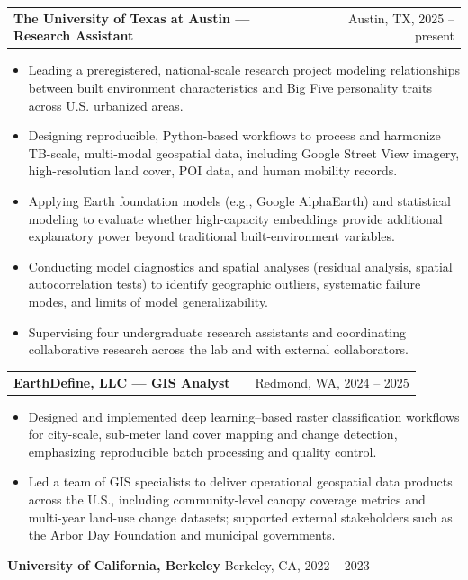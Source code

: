 \documentclass[a4paper,12pt]{article}
\makeatletter
\newenvironment{joblong}[2]
{
\begin{tabularx}{\linewidth}{@{}l X r@{}}
\textbf{#1} & \hfill &  #2 \\[3.75pt]
\end{tabularx}
\begin{minipage}[t]{\linewidth}
\begin{itemize}[nosep,after=\strut,leftmargin=1.2em,itemsep=3pt,label=--]
}
{
\end{itemize}
\end{minipage}
}
\makeatother
\begin{document}
\begin{joblong}{The University of Texas at Austin --- Research Assistant}{Austin, TX, 2025 -- present}
\item Leading a preregistered, national-scale research project modeling relationships between built environment characteristics and Big Five personality traits across U.S. urbanized areas.
\item Designing reproducible, Python-based workflows to process and harmonize TB-scale, multi-modal geospatial data, including Google Street View imagery, high-resolution land cover, POI data, and human mobility records.
\item Applying Earth foundation models (e.g., Google AlphaEarth) and statistical modeling to evaluate whether high-capacity embeddings provide additional explanatory power beyond traditional built-environment variables.
\item Conducting model diagnostics and spatial analyses (residual analysis, spatial autocorrelation tests) to identify geographic outliers, systematic failure modes, and limits of model generalizability.
\item Supervising four undergraduate research assistants and coordinating collaborative research across the lab and with external collaborators.
\end{joblong}


\begin{joblong}{EarthDefine, LLC --- GIS Analyst}{Redmond, WA, 2024 -- 2025}
\item Designed and implemented deep learning–based raster classification workflows for city-scale, sub-meter land cover mapping and change detection, emphasizing reproducible batch processing and quality control.
\item Led a team of GIS specialists to deliver operational geospatial data products across the U.S., including community-level canopy coverage metrics and multi-year land-use change datasets; supported external stakeholders such as the Arbor Day Foundation and municipal governments.
\end{joblong}


\textbf{University of California, Berkeley} \hfill Berkeley, CA, 2022 -- 2023 \\
\vspace{-18pt}
\end{document}

